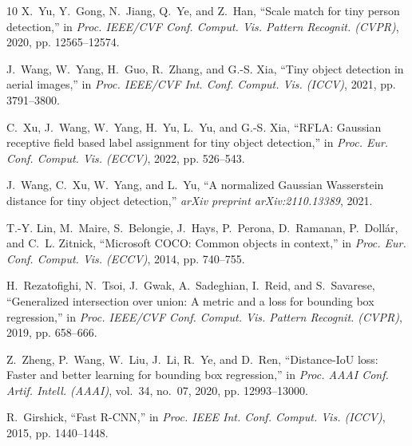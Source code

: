 \documentclass[10pt,twocolumn]{article}
\begin{document}
\begin{thebibliography}{10}
X.~Yu, Y.~Gong, N.~Jiang, Q.~Ye, and Z.~Han, ``Scale match for tiny person detection,'' in \emph{Proc. IEEE/CVF Conf. Comput. Vis. Pattern Recognit. (CVPR)}, 2020, pp. 12565--12574.

J.~Wang, W.~Yang, H.~Guo, R.~Zhang, and G.-S. Xia, ``Tiny object detection in aerial images,'' in \emph{Proc. IEEE/CVF Int. Conf. Comput. Vis. (ICCV)}, 2021, pp. 3791--3800.

C.~Xu, J.~Wang, W.~Yang, H.~Yu, L.~Yu, and G.-S. Xia, ``RFLA: Gaussian receptive field based label assignment for tiny object detection,'' in \emph{Proc. Eur. Conf. Comput. Vis. (ECCV)}, 2022, pp. 526--543.

J.~Wang, C.~Xu, W.~Yang, and L.~Yu, ``A normalized Gaussian Wasserstein distance for tiny object detection,'' \emph{arXiv preprint arXiv:2110.13389}, 2021.

T.-Y. Lin, M.~Maire, S.~Belongie, J.~Hays, P.~Perona, D.~Ramanan, P.~Doll{\'a}r, and C.~L. Zitnick, ``Microsoft COCO: Common objects in context,'' in \emph{Proc. Eur. Conf. Comput. Vis. (ECCV)}, 2014, pp. 740--755.

H.~Rezatofighi, N.~Tsoi, J.~Gwak, A.~Sadeghian, I.~Reid, and S.~Savarese, ``Generalized intersection over union: A metric and a loss for bounding box regression,'' in \emph{Proc. IEEE/CVF Conf. Comput. Vis. Pattern Recognit. (CVPR)}, 2019, pp. 658--666.

Z.~Zheng, P.~Wang, W.~Liu, J.~Li, R.~Ye, and D.~Ren, ``Distance-IoU loss: Faster and better learning for bounding box regression,'' in \emph{Proc. AAAI Conf. Artif. Intell. (AAAI)}, vol.~34, no.~07, 2020, pp. 12993--13000.

R.~Girshick, ``Fast R-CNN,'' in \emph{Proc. IEEE Int. Conf. Comput. Vis. (ICCV)}, 2015, pp. 1440--1448.
\end{thebibliography}
\end{document}
